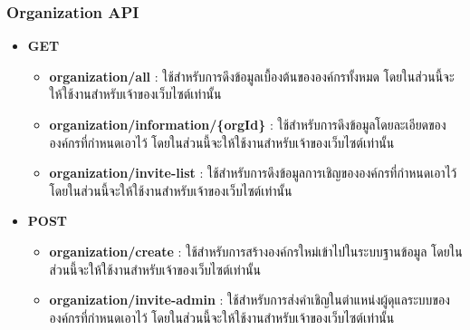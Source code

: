 \subsubsection{Organization API}

\ifenglish
\else
\begin{itemize}
    \item \textbf{GET}
    \begin{itemize}
        \item \textbf{organization/all} : ใช้สำหรับการดึงข้อมูลเบื้องต้นขององค์กรทั้งหมด โดยในส่วนนี้จะให้ใช้งานสำหรับเจ้าของเว็บไซต์เท่านั้น
        \item \textbf{organization/information/\{orgId\}} : ใช้สำหรับการดึงข้อมูลโดยละเอียดขององค์กรที่กำหนดเอาไว้ โดยในส่วนนี้จะให้ใช้งานสำหรับเจ้าของเว็บไซต์เท่านั้น
        \item \textbf{organization/invite-list} : ใช้สำหรับการดึงข้อมูลการเชิญขององค์กรที่กำหนดเอาไว้ โดยในส่วนนี้จะให้ใช้งานสำหรับเจ้าของเว็บไซต์เท่านั้น
    \end{itemize}
    \item \textbf{POST}
    \begin{itemize}
        \item \textbf{organization/create} : ใช้สำหรับการสร้างองค์กรใหม่เข้าไปในระบบฐานข้อมูล โดยในส่วนนี้จะให้ใช้งานสำหรับเจ้าของเว็บไซต์เท่านั้น
        \item \textbf{organization/invite-admin} : ใช้สำหรับการส่งคำเชิญในตำแหน่งผู้ดุแลระบบขององค์กรที่กำหนดเอาไว้ โดยในส่วนนี้จะให้ใช้งานสำหรับเจ้าของเว็บไซต์เท่านั้น
    \end{itemize}
\end{itemize}
\fi

\clearpage